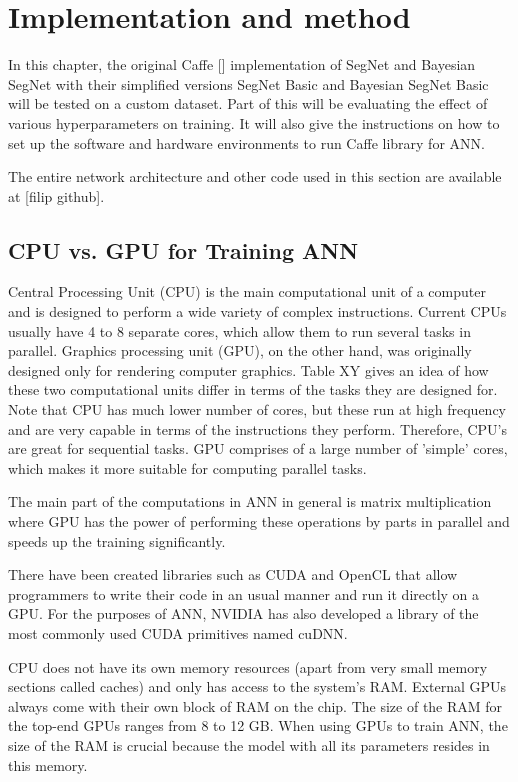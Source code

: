 \chapter{Implementation and method}

In this chapter, the original Caffe [] implementation of SegNet and Bayesian SegNet with their simplified versions SegNet Basic and Bayesian SegNet Basic will be tested on a custom dataset. Part of this will be evaluating the effect of various hyperparameters on training. It will also give the instructions on how to set up the software and hardware environments to run Caffe library for ANN.

The entire network architecture and other code used in this section are available at [filip github].

\section{CPU vs. GPU for Training ANN}

Central Processing Unit (CPU) is the main computational unit of a computer and is designed to perform a wide variety of complex instructions. Current CPUs usually have 4 to 8 separate cores, which allow them to run several tasks in parallel. Graphics processing unit (GPU), on the other hand, was originally designed only for rendering computer graphics. Table XY gives an idea of how these two computational units differ in terms of the tasks they are designed for. Note that CPU has much lower number of cores, but these run at high frequency and are very capable in terms of the instructions they perform. Therefore, CPU's are great for sequential tasks. GPU comprises of a large number of 'simple' cores, which makes it more suitable for computing parallel tasks. 

The main part of the computations in ANN in general is matrix multiplication where GPU has the power of performing these operations by parts in parallel and speeds up the training significantly.

There have been created libraries such as CUDA and OpenCL that allow programmers to write their code in an usual manner and run it directly on a GPU. For the purposes of ANN, NVIDIA has also developed a library of the most commonly used CUDA primitives named cuDNN. 
 
CPU does not have its own memory resources (apart from very small memory sections called caches) and only has access to the system's RAM. External GPUs always come with their own block of RAM on the chip. The size of the RAM for the top-end GPUs ranges from 8 to 12 GB. When using GPUs to train ANN, the size of the RAM is crucial because the model with all its parameters resides in this memory. 

